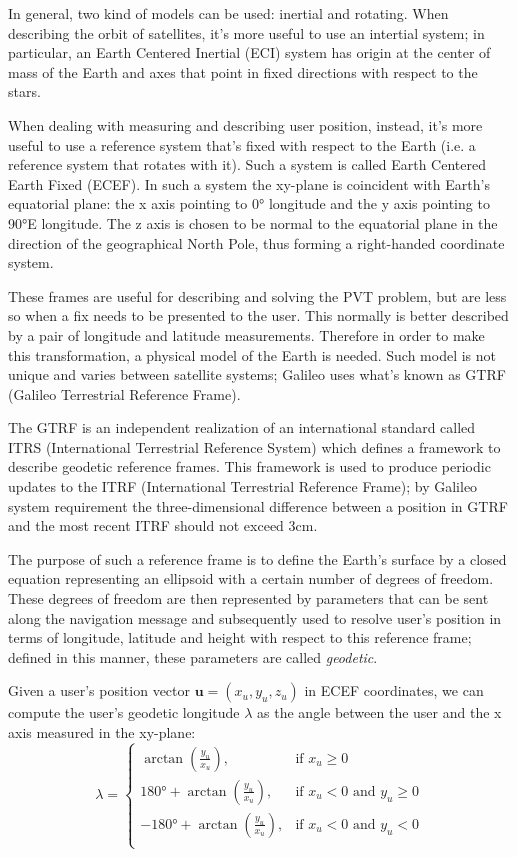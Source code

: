 \par

In general, two kind of models can be used: inertial and rotating. When
describing the orbit of satellites, it's more useful to use an intertial system;
in particular, an Earth Centered Inertial (ECI) system has origin at the center
of mass of the Earth and axes that point in fixed directions with respect to the
stars.

When dealing with measuring and describing user position, instead, it's more
useful to use a reference system that's fixed with respect to the Earth (i.e. a
reference system that rotates with it). Such a system is called Earth Centered
Earth Fixed (ECEF). In such a system the xy-plane is coincident with Earth's
equatorial plane: the x axis pointing to 0° longitude and the y axis pointing to
90°E longitude. The z axis is chosen to be normal to the equatorial plane in the
direction of the geographical North Pole, thus forming a right-handed coordinate
system.

These frames are useful for describing and solving the PVT problem, but are less
so when a fix needs to be presented to the user. This normally is better
described by a pair of longitude and latitude measurements. Therefore in order
to make this transformation, a physical model of the Earth is needed. Such model
is not unique and varies between satellite systems; Galileo uses what's known as
GTRF (Galileo Terrestrial Reference Frame).

The GTRF is an independent realization of an international standard called ITRS
(International Terrestrial Reference System) which defines a framework to
describe geodetic reference frames. This framework is used to produce periodic
updates to the ITRF (International Terrestrial Reference Frame); by Galileo
system requirement the three-dimensional difference between a position in GTRF
and the most recent ITRF should not exceed 3cm.

The purpose of such a reference frame is to define the Earth's surface by a
closed equation representing an ellipsoid with a certain number of degrees of
freedom. These degrees of freedom are then represented by parameters that can be
sent along the navigation message and subsequently used to resolve user's
position in terms of longitude, latitude and height with respect to this
reference frame; defined in this manner, these parameters are called
\textit{geodetic}.

Given a user's position vector $\bm{u} = (x_u, y_u, z_u)$ in ECEF coordinates,
we can compute the user's geodetic longitude $\lambda$ as the angle between the
user and the x axis measured in the xy-plane:
\begin{equation}
  \lambda = \begin{cases}
    \arctan \left(\frac{y_u}{x_u}\right),& \text{if } x_u \geq 0 \\
    180°+\arctan \left(\frac{y_u}{x_u}\right),& \text{if } x_u < 0 \text{ and } y_u \geq 0\\
    -180°+\arctan \left(\frac{y_u}{x_u}\right),& \text{if } x_u < 0 \text{ and } y_u < 0\\
  \end{cases}
\end{equation}

